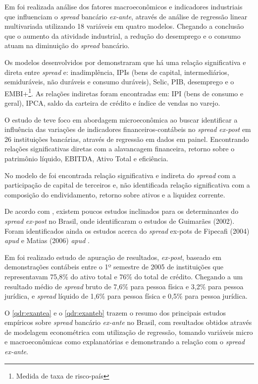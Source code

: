 \documentclass[
  12pt,
  12pt,
  openright,
  oneside,
  a4paper,
  chapter=TITLE,
  section=TITLE,
  subsection=TITLE,
  subsubsection=TITLE,
  english,
  portugues,
  sumario=tradicional]{abntex2}
\begin{document}
Em \textcite{durigan:2018} foi realizada análise dos fatores macroeconômicos e indicadores industriais que influenciam o \emph{spread} bancário \emph{ex-ante}, através de análise de regressão linear multivariada utilizando 18 variáveis em quatro modelos. Chegando a conclusão que o aumento da atividade industrial, a redução
do desemprego e o consumo atuam na diminuição do \emph{spread} bancário.

Os modelos desenvolvidos por \textcite{durigan:2018} demonstraram que há uma relação significativa e direta entre \emph{spread} e: inadimplência, IPIs (bens de capital, intermediários, semiduráveis, não duráveis e consumo duráveis), Selic, PIB, desemprego e o EMBI+\footnote{Medida de taxa de risco-país}. As relações indiretas foram encontradas em: IPI (bens de consumo e geral), IPCA, saldo da carteira de crédito e índice de vendas no varejo.

O estudo de \textcite{timotio:2018} teve foco em abordagem microeconômica ao buscar identificar a influência das variações de indicadores financeiros-contábeis no \emph{spread ex-post} em 26 instituições bancárias, através de regressão em dados em painel. Encontrando relações significativas diretas com a alavancagem financeira, retorno sobre o patrimônio líquido, EBITDA, Ativo Total e eficiência.

No modelo de \textcite{timotio:2018} foi encontrada relação significativa e indireta do \emph{spread} com a participação de capital de terceiros e, não identificada relação significativa com a composição do endividamento, retorno sobre ativos e a liquidez corrente.

De acordo com \textcite{durigan:2018, dantas:2012}, existem poucos estudos inclinados para os determinantes do \emph{spread} \emph{ex-post} no Brasil, onde identificaram o estudos de Guimarães (2002). Foram identificados ainda os estudos acerca do \emph{spread} ex-pots de Fipecafi (2004) \emph{apud} \textcite{dantas:2012} e Matias (2006) \emph{apud} \textcite{leal:2006}.

Em \textcite{fipecafi:2005} foi realizado estudo de apuração de resultados, \emph{ex-post}, baseado em demonstrações contábeis entre o 1º semestre de 2005 de instituições que representavam 75,8\% do ativo total e 76\% do total de crédito. Chegando a um resultado médio de \emph{spread} bruto de 7,6\% para pessoa física e 3,2\% para pessoa jurídica, e \emph{spread} líquido de 1,6\% para pessoa física e 0,5\% para pessoa jurídica.

O \autoref{qdr:exantea} e o \autoref{qdr:exanteb} trazem o resumo dos principais estudos empíricos sobre \emph{spread} bancário \emph{ex-ante} no Brasil, com resultados obtidos através de modelagem econométrica com utilização de regressão, tomando variáveis micro e macroeconômicas como explanatórias e demonstrando a relação com o \emph{spread ex-ante}.
\end{document}
